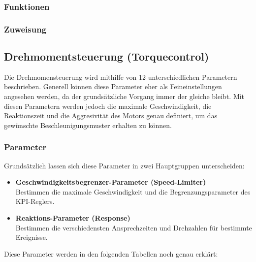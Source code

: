 \subsubsection{Funktionen}
\subsubsection{Zuweisung}

\newpage

\subsection{Drehmomentsteuerung (Torquecontrol)}
Die Drehmomensteuerung wird mithilfe von 12 unterschiedlichen Parametern beschrieben. Generell können diese Parameter eher als Feineinstellungen angesehen werden, da der grundsätzliche Vorgang immer der gleiche bleibt. Mit diesen Parametern werden jedoch die maximale Geschwindigkeit, die Reaktionszeit und die Aggresivität des Motors genau definiert, um das gewünschte Beschleunigungsmuster erhalten zu können.

\vspace{5mm}
 
\subsubsection{Parameter}
Grundsätzlich lassen sich diese Parameter in zwei Hauptgruppen unterscheiden:
\\[5mm]
\begin{itemize}
	\item \textbf{Geschwindigkeitsbegrenzer-Parameter (Speed-Limiter)}
	\\ \medskip Bestimmen die maximale Geschwindigkeit und die Begrenzungsparameter des KPI-Reglers.
	\medskip
	\item \textbf{Reaktions-Parameter (Response)}
	\\ \medskip Bestimmen die verschiedensten Ansprechzeiten und Drehzahlen für bestimmte Ereignisse.
\end{itemize}

\vspace{5mm}

Diese Parameter werden in den folgenden Tabellen noch genau erklärt:

\vspace{5mm}

